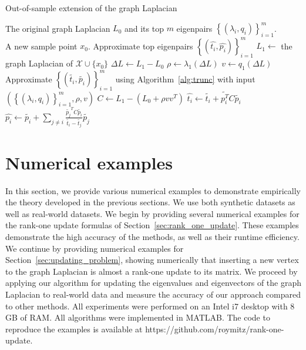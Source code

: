 \documentclass[11pt]{article}
\begin{document}
\begin{algorithm}[ht]
\caption{Out-of-sample extension of the graph Laplacian}
\label{alg:extension_algo_corr}
\begin{algorithmic}[1]
\REQUIRE  The original graph Laplacian $L_0$ and its top $m$ eigenpairs $ \left\lbrace  \left( \lambda_i, q_i \right) \right\rbrace_{i=1}^m$. \\ A new sample point $x_0$.
\ENSURE Approximate top eigenpairs $ \left\lbrace  \left( \widehat{t_i},\widehat{p_i} \right) \right\rbrace_{i=1}^m$
\STATE $L_1 \gets $ the graph Laplacian of $\mathcal{X} \cup \{x_0\}$ \label{alg2:line1}
\STATE $\Delta L \gets L_1 - L_0$
\STATE $ \rho \gets \lambda_1(\Delta L)$   \label{alg2:line3}
\STATE $ v \gets q_1 ( \Delta L)$                 \label{alg2:line4}
\STATE Approximate $\left\lbrace  \left( \widetilde{t_i},\widetilde{p_i} \right) \right\rbrace_{i=1}^m $ using Algorithm~\ref{alg:trunc} with input $\left( \left\lbrace  \left( \lambda_i, q_i \right) \right\rbrace_{i=1}^m, \rho, v \right)$
\label{alg2:line5}
\STATE $C \gets L_1 - (L_0 + \rho v v^T)$
\label{alg2:line6}
 \label{alg2:line7}
\STATE  $ \widehat{t_i} \gets \widetilde{t_i} + \widetilde{p_i^T} C \widetilde{p_i}$
\STATE $ \widehat{p_i} \gets  \widetilde{p_i} + \sum_{j\neq i} { \frac{\widetilde{p_j}^TC\widetilde{p_i}}{\widetilde{t_i} - \widetilde{t_j}} \widetilde{p_j} }$ \label{alg2:line9}
\ENDFOR \label{alg2:line10}
\end{algorithmic}
\end{algorithm}

\section{Numerical examples} \label{sec:numeric}

In this section, we provide various numerical examples to demonstrate empirically the theory developed in the previous sections. We use both synthetic datasets as well as real-world datasets. We begin by providing several numerical examples for the rank-one update formulas of Section~\ref{sec:rank_one_update}. These examples demonstrate the high accuracy of the methods, as well as their runtime efficiency. We continue by providing numerical examples for Section~\ref{sec:updating_problem}, showing numerically that inserting a new vertex to the graph Laplacian is almost a rank-one update to its matrix. We proceed by applying our algorithm for updating the eigenvalues and eigenvectors of the graph Laplacian to real-world data and measure the accuracy of our approach compared to other methods. All experiments were performed on an Intel i7 desktop with $8$GB of RAM. All algorithms were implemented in MATLAB. The code to reproduce the examples is available at https://github.com/roymitz/rank-one-update.
\end{document}
